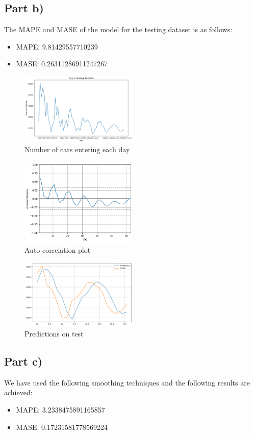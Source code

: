 \subsection{Part b)}
The MAPE and MASE of the model for the testing dataset is as follows:
\begin{itemize}[noitemsep]
	\item MAPE:  9.81429557710239
	\item MASE:  0.26311286911247267
\end{itemize}
\begin{figure}[h]
	\centering
	\includegraphics[width=0.5\textwidth]{1b_plot1.png}
	\caption{Number of cars entering each day}
\end{figure}

\begin{figure}[h]
	\centering
	\includegraphics[width=0.5\textwidth]{1b_ac_plot.png}
	\caption{Auto correlation plot}
\end{figure}

\begin{figure}[h]
	\centering
	\includegraphics[width=0.5\textwidth]{1b_predictions.png}
	\caption{Predictions on test}
\end{figure}

\subsection{Part c)}
We have used the following smoothing techniques and the following results are achieved:
\begin{itemize}
	\item MAPE:  3.2338475891165857
	\item MASE:  0.17231581778569224
\end{itemize}

